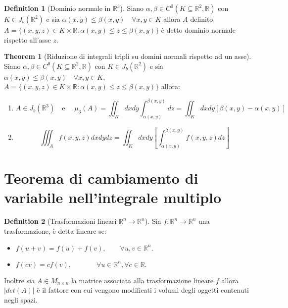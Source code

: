 \documentclass[leqno]{article}
\theoremstyle{definition}
\newtheorem{definition}{Definition}[section]
\numberwithin{equation}{section}
\newtheorem{theorem}{Theorem}[section]
\theoremstyle{remark}
\begin{document}
	\begin{definition}[Dominio normale in $\mathbb{R}^3$]
		Siano $\alpha ,\beta \in C^0(K \subseteq \mathbb{R}^2,\mathbb{R})$ con $K \in J_b(\mathbb{R}^2)$ e sia $\alpha(x,y)\le \beta(x,y) \quad \forall x,y \in K$ allora $A$ definito $A=\{(x,y,z) \in K \times \mathbb{R}:\alpha(x,y)\le z \le \beta(x,y)\}$ è detto dominio normale rispetto all'asse $z$. 
	\end{definition}
	\begin{theorem}[Riduzione di integrali tripli su domini normali rispetto ad un asse]
		Siano $\alpha,\beta \in C^0(K\subseteq \mathbb{R}^2,\mathbb{R})$ con $K\in J_b(\mathbb{R}^2)$ e sia $\alpha(x,y)\le \beta(x,y) \quad \forall x,y\in K$, $A=\{(x,y,z)\in K\times \mathbb{R}:\alpha(x,y)\le z \le \beta(x,y)\}$ allora:
		\begin{enumerate}
			\item \begin{equation}       
				A\in J_b(\mathbb{R}^3) \quad \text{e } \quad\mu_3(A)=\iint_Kdxdy\int_{\alpha(x,y)}^{\beta(x,y)}dz= \iint_K dxdy[\beta(x,y)-\alpha(x,y)]
			\end{equation}
			\item \begin{equation}
				\iiint_Af(x,y,z)dxdydz=\iint_Kdxdy\left[\int_{\alpha(x,y)}^{\beta(x,y)}f(x,y,z)dz\right]
			\end{equation}
		\end{enumerate}
		
	\end{theorem}
	
	
	\section{Teorema di cambiamento di variabile nell'integrale multiplo}
	
	\begin{definition}[Trasformazioni lineari $\mathbb{R}^n \to \mathbb{R}^n$]
		Sia $f:\mathbb{R}^n \to \mathbb{R}^n$ una trasformazione, è detta lineare se:
		\begin{itemize}
			\item $f(u+v)=f(u) + f(v), \quad \quad \forall u,v \in \mathbb{R}^n.$
			\item $f(cv)=cf(v), \quad \quad \quad \; \; 
			\forall u\in \mathbb{R}^n, \forall c \in \mathbb{R}.$
		\end{itemize}
		Inoltre sia $A\in M_{n\times n}$ la matrice associata alla trasformazione lineare $f$ allora $\left| det(A) \right|$ è il fattore con cui vengono modificati i volumi degli oggetti contenuti negli spazi. 
	\end{definition}
	
\end{document}
